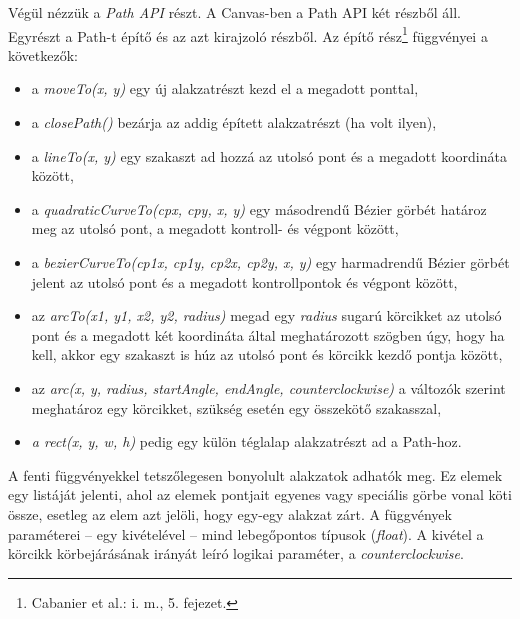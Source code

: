 \documentclass[12pt]{report}
\theoremstyle{definition}
\newcommand{\func}[1]{{\textsl{#1}}}
\begin{document}
Végül nézzük a \emph{Path API} részt. A Canvas-ben a Path API két részből áll.
Egyrészt a Path-t építő és az azt kirajzoló részből. Az építő
rész\footnote{Cabanier et al.: i. m., 5. fejezet.} függvényei a következők:
\begin{itemize}
  \item a \func{moveTo(x, y)} egy új alakzatrészt kezd el a megadott ponttal,
  \item a \func{closePath()} bezárja az addig épített alakzatrészt (ha volt
  ilyen),
  \item a \func{lineTo(x, y)} egy szakaszt ad hozzá az utolsó pont és
  a megadott koordináta között,
  \item a \func{quadraticCurveTo(cpx, cpy, x, y)} egy másodrendű Bézier
  görbét határoz meg az utolsó pont, a megadott kontroll- és végpont között,
  \item a \func{bezierCurveTo(cp1x, cp1y, cp2x, cp2y, x, y)} egy harmadrendű
  Bézier görbét jelent az utolsó pont és a megadott kontrollpontok és végpont
  között,
  \item az \func{arcTo(x1, y1, x2, y2, radius)} megad egy \func{radius} sugarú
  körcikket az utolsó
  pont és a megadott két koordináta által meghatározott szögben úgy,
  hogy ha kell, akkor egy szakaszt is húz az utolsó pont és körcikk kezdő
  pontja között,
  \item az \func{arc(x, y, radius, startAngle, endAngle, counterclockwise)} a
  változók szerint meghatároz egy körcikket, szükség esetén egy összekötő
  szakasszal,
  \item \func{a rect(x, y, w, h)} pedig egy külön téglalap alakzatrészt ad a
  Path-hoz.
\end{itemize}

A fenti függvényekkel tetszőlegesen bonyolult alakzatok adhatók meg. Ez elemek
egy listáját jelenti, ahol az elemek pontjait egyenes vagy speciális görbe
vonal köti össze, esetleg az elem azt jelöli, hogy egy-egy alakzat zárt. A
függvények paraméterei -- egy kivételével -- mind lebegőpontos típusok
(\func{float}). A kivétel a körcikk körbejárásának irányát leíró logikai
paraméter, a \func{counterclockwise}.
\end{document}
